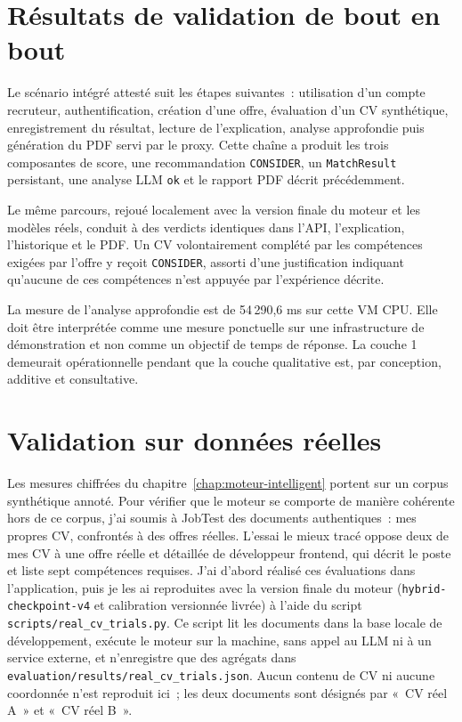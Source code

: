 \section{Résultats de validation de bout en bout}

Le scénario intégré attesté suit les étapes suivantes~: utilisation d'un compte recruteur, authentification, création d'une offre, évaluation d'un CV synthétique, enregistrement du résultat, lecture de l'explication, analyse approfondie puis génération du PDF servi par le proxy. Cette chaîne a produit les trois composantes de score, une recommandation \texttt{CONSIDER}, un \texttt{MatchResult} persistant, une analyse LLM \texttt{ok} et le rapport PDF décrit précédemment.

Le même parcours, rejoué localement avec la version finale du moteur et les modèles réels, conduit à des verdicts identiques dans l'API, l'explication, l'historique et le PDF. Un CV volontairement complété par les compétences exigées par l'offre y reçoit \texttt{CONSIDER}, assorti d'une justification indiquant qu'aucune de ces compétences n'est appuyée par l'expérience décrite.

La mesure de l'analyse approfondie est de 54\,290,6 ms sur cette VM CPU. Elle doit être interprétée comme une mesure ponctuelle sur une infrastructure de démonstration et non comme un objectif de temps de réponse. La couche 1 demeurait opérationnelle pendant que la couche qualitative est, par conception, additive et consultative.

\section{Validation sur données réelles}
\label{sec:chap6-reel}

Les mesures chiffrées du chapitre~\ref{chap:moteur-intelligent} portent sur un corpus synthétique annoté. Pour vérifier que le moteur se comporte de manière cohérente hors de ce corpus, j'ai soumis à JobTest des documents authentiques~: mes propres CV, confrontés à des offres réelles. L'essai le mieux tracé oppose deux de mes CV à une offre réelle et détaillée de développeur frontend, qui décrit le poste et liste sept compétences requises. J'ai d'abord réalisé ces évaluations dans l'application, puis je les ai reproduites avec la version finale du moteur (\texttt{hybrid-checkpoint-v4} et calibration versionnée livrée) à l'aide du script \texttt{scripts/real\_cv\_trials.py}. Ce script lit les documents dans la base locale de développement, exécute le moteur sur la machine, sans appel au LLM ni à un service externe, et n'enregistre que des agrégats dans \texttt{evaluation/results/real\_cv\_trials.json}. Aucun contenu de CV ni aucune coordonnée n'est reproduit ici~; les deux documents sont désignés par «~CV réel A~» et «~CV réel B~».

